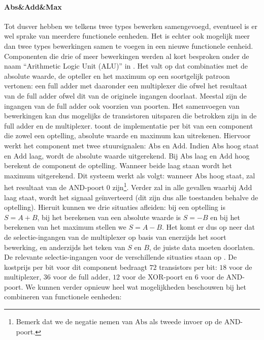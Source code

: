 \paragraph{Abs\&Add\&Max}Tot dusver hebben we telkens twee types bewerken samengevoegd, eventueel is er wel sprake van meerdere functionele eenheden. Het is echter ook mogelijk meer dan twee types bewerkingen samen te voegen in een nieuwe functionele eenheid. Componenten die drie of meer bewerkingen werden al kort besproken onder de naam ``Arithmetic Logic Unit (ALU)'' in . Het valt op dat combinaties met de absolute waarde, de opteller en het maximum op  een soortgelijk patroon vertonen: een full adder met daaronder een multiplexer die ofwel het resultaat van de full adder ofwel dit van de originele ingangen doorlaat. Meestal zijn de ingangen van de full adder ook voorzien van poorten. Het samenvoegen van bewerkingen kan dus mogelijks de transistoren uitsparen die betrokken zijn in de full adder en de multiplexer.  toont de implementatie per bit van een component die zowel een optelling, absolute waarde en maximum kan uitrekenen.
Hiervoor werkt het component met twee stuursignalen: $\mbox{Abs}$ en $\mbox{Add}$. Indien $\mbox{Abs}$ hoog staat en $\mbox{Add}$ laag, wordt de absolute waarde uitgerekend. Bij $\mbox{Abs}$ laag en $\mbox{Add}$ hoog berekent de component de optelling. Wanneer beide laag staan wordt het maximum uitgerekend. Dit systeem werkt als volgt: wanneer $\mbox{Abs}$ hoog staat, zal het resultaat van de AND-poort $0$ zijn\footnote{Bemerk dat we de negatie nemen van $\mbox{Abs}$ als tweede invoer op de AND-poort.}. Verder zal in alle gevallen waarbij $\mbox{Add}$ laag staat, wordt het signaal ge\"inverteerd (dit zijn dus alle toestanden behalve de optelling). Hieruit kunnen we drie situaties afleiden: bij een optelling is $S=A+B$, bij het berekenen van een absolute waarde is $S=-B$ en bij het berekenen van het maximum stellen we $S=A-B$. Het komt er dus op neer dat de selectie-ingangen van de multiplexer op basis van enerzijds het soort bewerking, en anderzijds het teken van $S$ en $B$, de juiste data moeten doorlaten. De relevante selectie-ingangen voor de verschillende situaties staan op .
De kostprijs per bit voor dit component bedraagt $72$ transistors per bit: $18$ voor de multiplexer, $36$ voor de full adder, $12$ voor de XOR-poort en $6$ voor de AND-poort. We kunnen verder opnieuw heel wat mogelijkheden beschouwen bij het combineren van functionele eenheden:
